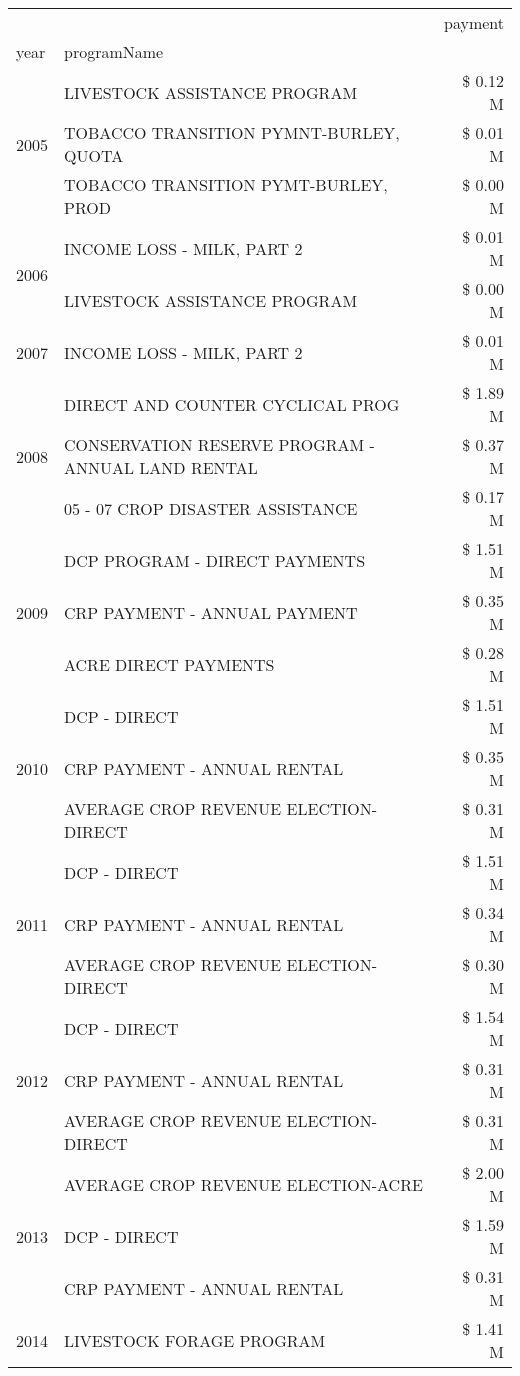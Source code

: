 \begin{tabular}{llr}
\toprule
 &  & payment \\
year & programName &  \\
\midrule
\multirow[t]{3}{*}{2005} & LIVESTOCK ASSISTANCE PROGRAM & \$ 0.12 M \\
 & TOBACCO TRANSITION PYMNT-BURLEY, QUOTA & \$ 0.01 M \\
 & TOBACCO TRANSITION PYMT-BURLEY, PROD & \$ 0.00 M \\
\cline{1-3}
\multirow[t]{2}{*}{2006} & INCOME LOSS - MILK, PART 2 & \$ 0.01 M \\
 & LIVESTOCK ASSISTANCE PROGRAM & \$ 0.00 M \\
\cline{1-3}
2007 & INCOME LOSS - MILK, PART 2 & \$ 0.01 M \\
\cline{1-3}
\multirow[t]{3}{*}{2008} & DIRECT AND COUNTER CYCLICAL PROG & \$ 1.89 M \\
 & CONSERVATION RESERVE PROGRAM - ANNUAL LAND RENTAL & \$ 0.37 M \\
 & 05 - 07 CROP DISASTER ASSISTANCE & \$ 0.17 M \\
\cline{1-3}
\multirow[t]{3}{*}{2009} & DCP PROGRAM - DIRECT PAYMENTS & \$ 1.51 M \\
 & CRP PAYMENT - ANNUAL PAYMENT & \$ 0.35 M \\
 & ACRE DIRECT PAYMENTS & \$ 0.28 M \\
\cline{1-3}
\multirow[t]{3}{*}{2010} & DCP - DIRECT & \$ 1.51 M \\
 & CRP PAYMENT - ANNUAL RENTAL & \$ 0.35 M \\
 & AVERAGE CROP REVENUE ELECTION-DIRECT & \$ 0.31 M \\
\cline{1-3}
\multirow[t]{3}{*}{2011} & DCP - DIRECT & \$ 1.51 M \\
 & CRP PAYMENT - ANNUAL RENTAL & \$ 0.34 M \\
 & AVERAGE CROP REVENUE ELECTION-DIRECT & \$ 0.30 M \\
\cline{1-3}
\multirow[t]{3}{*}{2012} & DCP - DIRECT & \$ 1.54 M \\
 & CRP PAYMENT - ANNUAL RENTAL & \$ 0.31 M \\
 & AVERAGE CROP REVENUE ELECTION-DIRECT & \$ 0.31 M \\
\cline{1-3}
\multirow[t]{3}{*}{2013} & AVERAGE CROP REVENUE ELECTION-ACRE & \$ 2.00 M \\
 & DCP - DIRECT & \$ 1.59 M \\
 & CRP PAYMENT - ANNUAL RENTAL & \$ 0.31 M \\
\cline{1-3}
\multirow[t]{3}{*}{2014} & LIVESTOCK FORAGE PROGRAM & \$ 1.41 M \\

\end{tabular}
